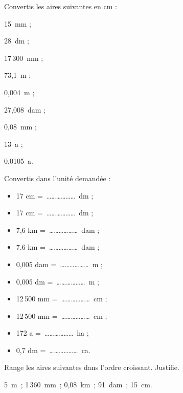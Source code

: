 \begin{exercice}
Convertis les aires suivantes en cm :
\begin{colenumerate}{3}
 \item 15 mm ;
 \item 28 dm ;
 \item 17\,300 mm ;
 \item 73,1 m ;
 \item 0,004 m ;
 \item 27,008 dam ;
 \item 0,08 mm ;
 \item 13 a ;
 \item 0,0105 a.
 \end{colenumerate}
\end{exercice}


\begin{exercice}
Convertis dans l’unité demandée :
\begin{itemize}
 \item 17 cm = \ldots \ldots \ldots \ldots \ldots \ldots dm ;
 \item 17 cm = \ldots \ldots \ldots \ldots \ldots \ldots dm ;
 \item 7,6 km = \ldots \ldots \ldots \ldots \ldots \ldots dam ;
 \item 7.6 km = \ldots \ldots \ldots \ldots \ldots \ldots dam ;
 \item 0,005 dam = \ldots \ldots \ldots \ldots \ldots \ldots m ;
 \item 0,005 dm = \ldots \ldots \ldots \ldots \ldots \ldots m ;
 \item 12\,500 mm = \ldots \ldots \ldots \ldots \ldots \ldots cm ;
 \item 12\,500 mm = \ldots \ldots \ldots \ldots \ldots \ldots cm ;
 \item 172 a = \ldots \ldots \ldots \ldots \ldots \ldots ha ;
 \item 0,7 dm = \ldots \ldots \ldots \ldots \ldots \ldots ca.
 \end{itemize}
\end{exercice}


\begin{exercice}
Range les aires suivantes dans l'ordre croissant. Justifie.

\begin{center} 5 m ; 1\,360 mm ; 0,08 km ; 91 dam ; 15 cm. \end{center}
\end{exercice}


